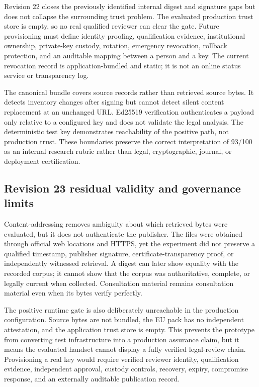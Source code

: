 Revision 22 closes the previously identified internal digest and signature gaps but does not collapse the surrounding trust problem. The evaluated production trust store is empty, so no real qualified reviewer can clear the gate. Future provisioning must define identity proofing, qualification evidence, institutional ownership, private-key custody, rotation, emergency revocation, rollback protection, and an auditable mapping between a person and a key. The current revocation record is application-bundled and static; it is not an online status service or transparency log.

The canonical bundle covers source records rather than retrieved source bytes. It detects inventory changes after signing but cannot detect silent content replacement at an unchanged URL. Ed25519 verification authenticates a payload only relative to a configured key and does not validate the legal analysis. The deterministic test key demonstrates reachability of the positive path, not production trust. These boundaries preserve the correct interpretation of 93/100 as an internal research rubric rather than legal, cryptographic, journal, or deployment certification.

\subsection{Revision 23 residual validity and governance limits}

Content-addressing removes ambiguity about which retrieved bytes were evaluated, but it does not authenticate the publisher. The files were obtained through official web locations and HTTPS, yet the experiment did not preserve a qualified timestamp, publisher signature, certificate-transparency proof, or independently witnessed retrieval. A digest can later show equality with the recorded corpus; it cannot show that the corpus was authoritative, complete, or legally current when collected. Consultation material remains consultation material even when its bytes verify perfectly.

The positive runtime gate is also deliberately unreachable in the production configuration. Source bytes are not bundled, the EU pack has no independent attestation, and the application trust store is empty. This prevents the prototype from converting test infrastructure into a production assurance claim, but it means the evaluated handset cannot display a fully verified legal-review chain. Provisioning a real key would require verified reviewer identity, qualification evidence, independent approval, custody controls, recovery, expiry, compromise response, and an externally auditable publication record.

